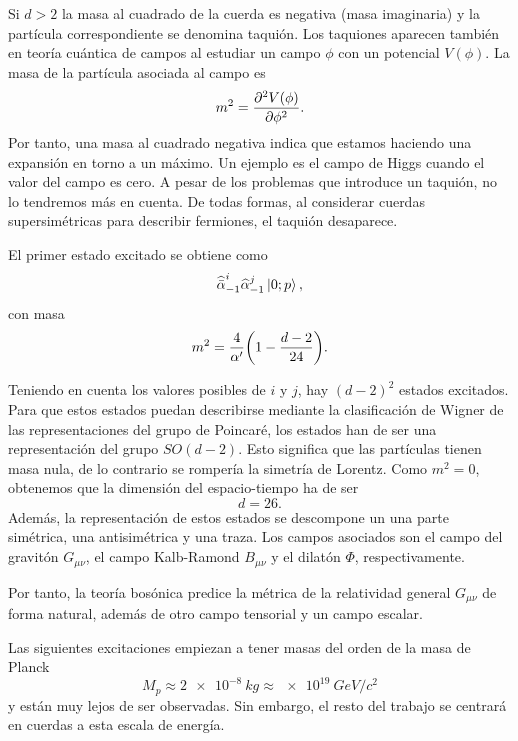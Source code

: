 Si $d>2$ la masa al cuadrado de la cuerda es negativa (masa imaginaria) y la partícula correspondiente se denomina taquión.
Los taquiones aparecen también en teoría cuántica de campos al estudiar un campo $\phi$ con un 
potencial $V(\phi)$.
La masa de la partícula asociada al campo es
\begin{equation}
  m^2 = \pdv[2]{V(\phi)}{\phi}.
\end{equation}
Por tanto, una masa al cuadrado negativa indica que estamos haciendo una expansión en torno
a un máximo. 
Un ejemplo es el campo de Higgs cuando el valor del campo es cero.
A pesar de los problemas que introduce un taquión, no lo tendremos más en cuenta. 
De todas formas, al considerar cuerdas supersimétricas para describir fermiones, el taquión
desaparece.

El primer estado excitado se obtiene como
\begin{equation}
  \widehat{\bar\alpha}_{-1}^i\widehat \alpha_{-1}^j\ket{0;p},
\end{equation}
con masa
\begin{equation}
  m^2 = \frac{4}{\alpha'}\qty(1-\frac{d-2}{24}).
\end{equation}

Teniendo en cuenta los valores posibles de $i$ y $j$, hay $(d-2)^2$ estados excitados.
Para que estos estados puedan describirse mediante la clasificación de Wigner de las
representaciones del grupo de Poincaré, los estados han de ser una representación del grupo  $SO(d-2)$.
Esto significa que las partículas tienen masa nula, de lo contrario se rompería la simetría
de Lorentz.
Como $m^2=0$, obtenemos que la dimensión del espacio-tiempo ha de ser
\begin{equation}
  d=26.
\end{equation}
Además, la representación de estos estados se descompone un una parte simétrica, una antisimétrica
y una traza. Los campos asociados son el campo del gravitón $G_{\mu\nu}$, el campo Kalb-Ramond $B_{\mu\nu}$
y el dilatón $\Phi$, respectivamente.

Por tanto, la teoría bosónica predice la métrica de la relatividad general $G_{\mu\nu}$ de forma 
natural, además de otro campo tensorial y un campo escalar.

Las siguientes excitaciones empiezan a tener masas del orden de la masa de Planck
\begin{equation}
  M_p\approx\SI{2e-8}{kg} \approx \SI{e19}{GeV/c^2}
\end{equation}
y están muy lejos de ser observadas. Sin embargo, el resto del trabajo se centrará en cuerdas
a esta escala de energía.


